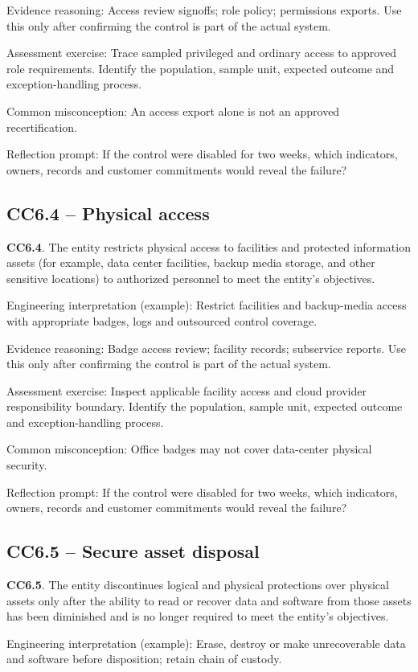 \documentclass[10pt,oneside]{report}
\begin{document}
Evidence reasoning: Access review signoffs; role policy; permissions exports. Use this only after confirming the control is part of the actual system.

Assessment exercise: Trace sampled privileged and ordinary access to approved role requirements. Identify the population, sample unit, expected outcome and exception-handling process.

Common misconception: An access export alone is not an approved recertification.

Reflection prompt: If the control were disabled for two weeks, which indicators, owners, records and customer commitments would reveal the failure?

\subsection{CC6.4 -- Physical access}
\begin{aicpabox}
\textbf{CC6.4}. The entity restricts physical access to facilities and protected information assets (for example, data center facilities, backup media storage, and other sensitive locations) to authorized personnel to meet the entity's objectives.\par{}
\end{aicpabox}
Engineering interpretation (example): Restrict facilities and backup-media access with appropriate badges, logs and outsourced control coverage.

Evidence reasoning: Badge access review; facility records; subservice reports. Use this only after confirming the control is part of the actual system.

Assessment exercise: Inspect applicable facility access and cloud provider responsibility boundary. Identify the population, sample unit, expected outcome and exception-handling process.

Common misconception: Office badges may not cover data-center physical security.

Reflection prompt: If the control were disabled for two weeks, which indicators, owners, records and customer commitments would reveal the failure?

\subsection{CC6.5 -- Secure asset disposal}
\begin{aicpabox}
\textbf{CC6.5}. The entity discontinues logical and physical protections over physical assets only after the ability to read or recover data and software from those assets has been diminished and is no longer required to meet the entity's objectives.\par{}
\end{aicpabox}
Engineering interpretation (example): Erase, destroy or make unrecoverable data and software before disposition; retain chain of custody.
\end{document}
